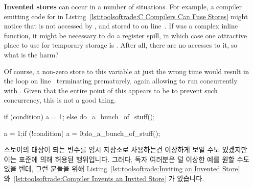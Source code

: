 \begin{fcvref}
{\bf Invented stores} can occur in a number of situations.
For example, a compiler emitting code for  in
Listing~\ref{lst:toolsoftrade:C Compilers Can Fuse Stores}
might notice that  is not accessed by
, and stored to on line~.
If  was a complex inline function, it might be
necessary to do a register spill, in which case one attractive
place to use for temporary storage is .
After all, there are no accesses to it, so what is the harm?

Of course, a non-zero store to this variable at just the wrong time
would result in the  loop on
line~ terminating
prematurely, again allowing  to run
concurrently with .
Given that the entire point of this  appears to be to
prevent such concurrency, this is not a good thing.
\end{fcvref}

\fi

\begin{listing}[tbp]
\begin{fcvlabel}
\begin{VerbatimL}[commandchars=\\\{\}]
if (condition)
	a = 1;
else
	do_a_bunch_of_stuff();
\end{VerbatimL}
\end{fcvlabel}
\caption{Inviting an Invented Store}
\label{lst:toolsoftrade:Inviting an Invented Store}
\end{listing}

\begin{listing}[tbp]
\begin{fcvlabel}
\begin{VerbatimL}[commandchars=\\\[\]]
a = 1;
if (!condition) {
	a = 0;
	do_a_bunch_of_stuff();
}
\end{VerbatimL}
\end{fcvlabel}
\caption{Compiler Invents an Invited Store}
\label{lst:toolsoftrade:Compiler Invents an Invited Store}
\end{listing}

스토어의 대상이 되는 변수를 임시 저장소로 사용하는건 이상하게 보일 수도
있겠지만 이는 표준에 의해 허용된 행위입니다.
그러다, 독자 여러분은 덜 이상한 예를 원할 수도 있을 텐데, 그런 분들을 위해
Listing~\ref{lst:toolsoftrade:Inviting an Invented Store}
와~\ref{lst:toolsoftrade:Compiler Invents an Invited Store}
가 있습니다.

